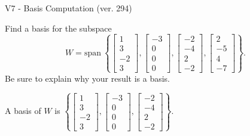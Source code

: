\begin{exercise}
  \begin{exerciseTitle}V7 - Basis Computation (ver. 294)\end{exerciseTitle}
  \begin{exerciseStatement}
    Find a basis for the subspace 
\[W=\mathrm{span}\ \left\{\left[\begin{array}{r}
1 \\
3 \\
-2 \\
3
\end{array}\right] , \left[\begin{array}{r}
-3 \\
0 \\
0 \\
0
\end{array}\right] , \left[\begin{array}{r}
-2 \\
-4 \\
2 \\
-2
\end{array}\right] , \left[\begin{array}{r}
2 \\
-5 \\
4 \\
-7
\end{array}\right]\right\}.\]
 Be sure to explain why your result is a basis.


  \end{exerciseStatement}
  \begin{exerciseAnswer}
   A basis of \(W\) is  \(\left\{\left[\begin{array}{r}
1 \\
3 \\
-2 \\
3
\end{array}\right] , \left[\begin{array}{r}
-3 \\
0 \\
0 \\
0
\end{array}\right] , \left[\begin{array}{r}
-2 \\
-4 \\
2 \\
-2
\end{array}\right]\right\}\).
  


  \end{exerciseAnswer}
\end{exercise}